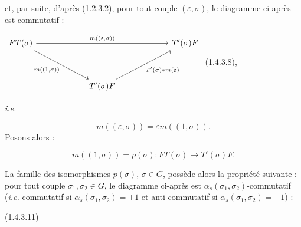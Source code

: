 %
et, par suite, d'après (1.2.3.2), pour tout couple
$(\varepsilon,\sigma)$, le diagramme ci-après est commutatif :

\begin{center}
  $\begin{tikzcd}[ampersand replacement=\&,column sep=6em,row sep=3.5em]
    FT(\sigma)
      \arrow[rr,"{m((\varepsilon,\sigma))}"]
      \arrow[dr,"{m((1,\sigma))}"']
      \& \& T'(\sigma)F \\
      \& T'(\sigma)F
        \arrow[ur,"{T'(\sigma)*m(\varepsilon)}"'] \&
  \end{tikzcd}$
  \hfill\textup{(1.4.3.8)},
\end{center}

\noindent\emph{i.e.}

\begin{equation}
  m((\varepsilon,\sigma))=\varepsilon m((1,\sigma)).
  \tag{1.4.3.9}
\end{equation}
Posons alors :

\begin{equation}
  m((1,\sigma))=p(\sigma)\colon
  FT(\sigma)\longrightarrow T'(\sigma)F.
  \tag{1.4.3.10}
\end{equation}

La famille des isomorphismes $p(\sigma)$, $\sigma\in G$, possède alors
la propriété suivante : pour tout couple $\sigma_1,\sigma_2\in G$, le
diagramme ci-après est $\alpha_s(\sigma_1,\sigma_2)$-commutatif
(\emph{i.e.} commutatif si $\alpha_s(\sigma_1,\sigma_2)=+1$ et
anti-commutatif si $\alpha_s(\sigma_1,\sigma_2)=-1$) :

\begin{center}
  \hfill\textup{(1.4.3.11)}
\end{center}

